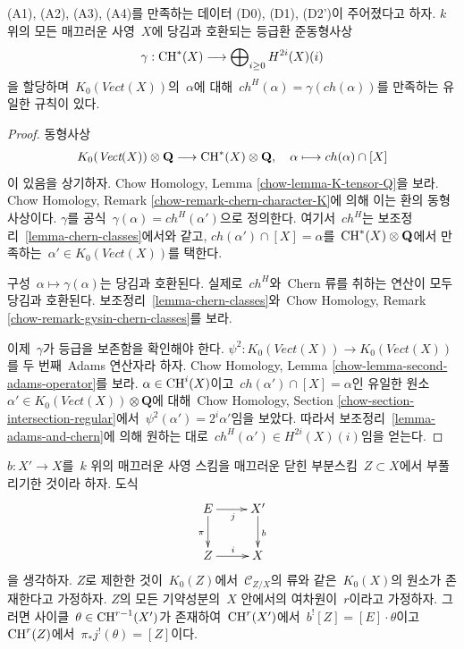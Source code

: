 \begin{lemma}
\label{lemma-cycle-classes}
(A1), (A2), (A3), (A4)를 만족하는 데이터 (D0), (D1), (D2')이
주어졌다고 하자. $k$ 위의 모든 매끄러운 사영\  $X$에 당김과
호환되는 등급환 준동형사상
$$
\gamma : \mathop{\mathrm{CH}}\nolimits^*(X) \longrightarrow \bigoplus\nolimits_{i \geq 0} H^{2i}(X)(i)
$$
을 할당하며\  $K_0(\textit{Vect}(X))$의\  $\alpha$에 대해\ 
$ch^H(\alpha) = \gamma(ch(\alpha))$를 만족하는 유일한 규칙이 있다.
\end{lemma}

\begin{proof}
동형사상
$$
K_0(\textit{Vect}(X)) \otimes \mathbf{Q}
\longrightarrow \mathop{\mathrm{CH}}\nolimits^*(X) \otimes \mathbf{Q},\quad
\alpha \longmapsto ch(\alpha) \cap [X]
$$
이 있음을 상기하자. Chow Homology, Lemma
\ref{chow-lemma-K-tensor-Q}을 보라. Chow Homology, Remark
\ref{chow-remark-chern-character-K}에 의해 이는 환의
동형사상이다. $\gamma$를 공식\  $\gamma(\alpha) = ch^H(\alpha')$으로
정의한다. 여기서\  $ch^H$는 보조정리\  \ref{lemma-chern-classes}에서와
같고, $ch(\alpha') \cap [X] = \alpha$를\ 
$\mathop{\mathrm{CH}}\nolimits^*(X) \otimes \mathbf{Q}$에서 만족하는\ 
$\alpha' \in K_0(\textit{Vect}(X))$를 택한다.

\medskip\noindent
구성\  $\alpha \mapsto \gamma(\alpha)$는 당김과 호환된다. 실제로\ 
$ch^H$와\  Chern 류를 취하는 연산이 모두 당김과 호환된다. 보조정리\ 
\ref{lemma-chern-classes}와\  Chow Homology, Remark
\ref{chow-remark-gysin-chern-classes}를 보라.

\medskip\noindent
이제\  $\gamma$가 등급을 보존함을 확인해야 한다.
$\psi^2 : K_0(\textit{Vect}(X)) \to K_0(\textit{Vect}(X))$를
두 번째\  Adams 연산자라 하자. Chow Homology, Lemma
\ref{chow-lemma-second-adams-operator}를 보라.
$\alpha \in \mathop{\mathrm{CH}}\nolimits^i(X)$이고\ 
$ch(\alpha') \cap [X] = \alpha$인 유일한 원소\ 
$\alpha' \in K_0(\textit{Vect}(X)) \otimes \mathbf{Q}$에 대해\ 
Chow Homology, Section \ref{chow-section-intersection-regular}에서\ 
$\psi^2(\alpha') = 2^i \alpha'$임을 보았다. 따라서 보조정리\ 
\ref{lemma-adams-and-chern}에 의해 원하는 대로\ 
$ch^H(\alpha') \in H^{2i}(X)(i)$임을 얻는다.
\end{proof}

\begin{lemma}
\label{lemma-divide-pullback-good-blowing-up}
$b : X' \to X$를\  $k$ 위의 매끄러운 사영 스킴을 매끄러운 닫힌
부분스킴\  $Z \subset X$에서 부풀리기한 것이라 하자. 도식
$$
\xymatrix{
E \ar[r]_j \ar[d]_\pi & X' \ar[d]^b \\
Z \ar[r]^i & X
}
$$
을 생각하자. $Z$로 제한한 것이\  $K_0(Z)$에서\ 
$\mathcal{C}_{Z/X}$의 류와 같은\  $K_0(X)$의 원소가 존재한다고
가정하자. $Z$의 모든 기약성분의\  $X$ 안에서의 여차원이\  $r$이라고
가정하자. 그러면 사이클\  $\theta \in \mathop{\mathrm{CH}}\nolimits^{r - 1}(X')$가 존재하여\ 
$\mathop{\mathrm{CH}}\nolimits^r(X')$에서\  $b^![Z] = [E] \cdot \theta$이고\ 
$\mathop{\mathrm{CH}}\nolimits^r(Z)$에서\  $\pi_*j^!(\theta) = [Z]$이다.
\end{lemma}

